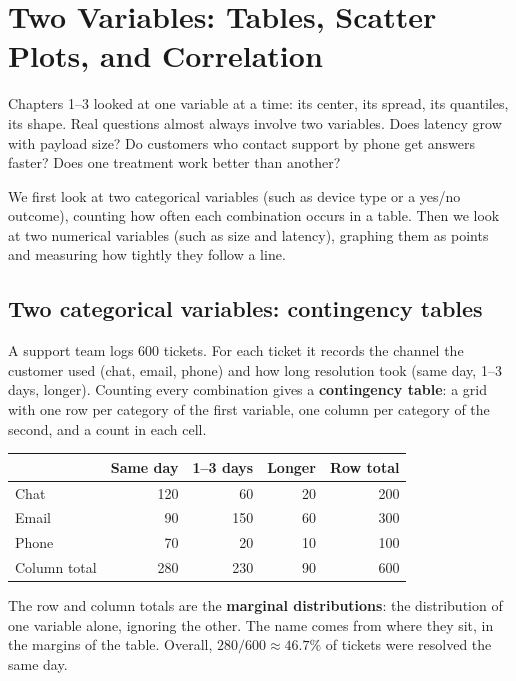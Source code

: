 \chapter{Two Variables: Tables, Scatter Plots, and Correlation}
\label{ch:two-variables}

Chapters 1--3 looked at one variable at a time: its center, its spread, its
quantiles, its shape. Real questions almost always involve two variables. Does latency grow
with payload size? Do customers who contact support by phone get answers faster?
Does one treatment work better than another?

We first look at two categorical variables (such as device type or a yes/no outcome),
counting how often each combination occurs in a table. Then we look at two numerical
variables (such as size and latency), graphing them as points and measuring how tightly
they follow a line.

\section{Two categorical variables: contingency tables}
\label{sec:corr-tables}

A support team logs 600 tickets. For each ticket it records the channel the
customer used (chat, email, phone) and how long resolution took (same day, 1--3
days, longer). Counting every combination gives a \textbf{contingency table}: a
grid with one row per category of the first variable, one column per category of
the second, and a count in each cell.

\begin{center}
\begin{tabular}{lrrrr}
\toprule
 & Same day & 1--3 days & Longer & Row total \\
\midrule
Chat  & 120 &  60 & 20 & 200 \\
Email &  90 & 150 & 60 & 300 \\
Phone &  70 &  20 & 10 & 100 \\
\midrule
Column total & 280 & 230 & 90 & 600 \\
\bottomrule
\end{tabular}
\end{center}

The row and column totals are the \textbf{marginal distributions}: the
distribution of one variable alone, ignoring the other. The name comes from where
they sit, in the margins of the table. Overall, $280/600 \approx 46.7\%$ of tickets
were resolved the same day.

